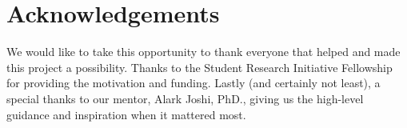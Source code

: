 \section{Acknowledgements}

We would like to take this opportunity to thank everyone that helped and made
this project a possibility. Thanks to the Student Research Initiative
Fellowship for providing the motivation and funding. Lastly (and certainly not
least), a special thanks to our mentor, Alark Joshi, PhD., giving us the
high-level guidance and inspiration when it mattered most.
